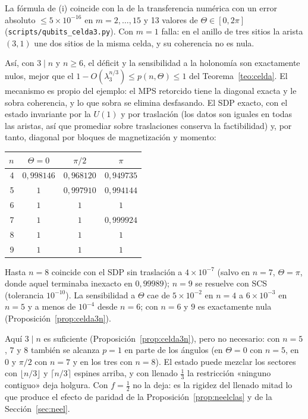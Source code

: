 \documentclass[11pt,a4paper]{article}
\theoremstyle{remark}
\begin{document}
La fórmula de (i) coincide con la de la transferencia numérica con un error absoluto
$\le5\times10^{-16}$ en $m=2,\dots,15$ y 13 valores de $\Theta\in[0,2\pi]$
(\texttt{scripts/qubits\_celda3.py}). Con $m=1$ falla: en el anillo de tres sitios la arista
$(3,1)$ une dos sitios de la misma celda, y su coherencia no es nula.

Así, con $3\mid n$ y $n\ge6$, el déficit y la sensibilidad a la holonomía son exactamente nulos,
mejor que el $1-O(\lambda_3^{n/3})\le p(n,\Theta)\le1$ del Teorema~\ref{teo:celda}. El mecanismo es
propio del ejemplo: el MPS retorcido tiene la diagonal exacta y le sobra coherencia, y lo que sobra
se elimina desfasando. El SDP
exacto, con el estado invariante por la $U(1)$ y por traslación (los datos son iguales en todas
las aristas, así que promediar sobre traslaciones conserva la factibilidad) y, por tanto,
diagonal por bloques de magnetización y momento:
\begin{center}\small
\begin{tabular}{rccc}
\toprule
$n$ & $\Theta=0$ & $\pi/2$ & $\pi$\\
\midrule
4 & $0{,}998146$ & $0{,}968120$ & $0{,}949735$\\
5 & $1$ & $0{,}997910$ & $0{,}994144$\\
6 & $1$ & $1$ & $1$\\
7 & $1$ & $1$ & $0{,}999924$\\
8 & $1$ & $1$ & $1$\\
9 & $1$ & $1$ & $1$\\
\bottomrule
\end{tabular}
\end{center}
Hasta $n=8$ coincide con el SDP sin traslación a $4\times10^{-7}$ (salvo en $n=7$, $\Theta=\pi$,
donde aquel terminaba inexacto en $0{,}99989$); $n=9$ se resuelve con SCS
(tolerancia $10^{-10}$). La sensibilidad a $\Theta$ cae de $5\times10^{-2}$ en
$n=4$ a $6\times10^{-3}$ en $n=5$ y a menos de $10^{-4}$ desde $n=6$; con $n=6$ y $9$ es exactamente
nula (Proposición~\ref{prop:celda3n}).

Aquí $3\mid n$ es suficiente (Proposición~\ref{prop:celda3n}), pero no necesario: con $n=5$, $7$
y $8$ también se alcanza $p=1$ en parte de los ángulos (en $\Theta=0$ con $n=5$, en $0$ y $\pi/2$
con $n=7$ y en los tres con $n=8$). El estado puede mezclar los sectores con $\lfloor n/3\rfloor$ y
$\lceil n/3\rceil$ espines arriba, y con llenado $\tfrac13$ la restricción «ninguno contiguo» deja
holgura. Con $f=\tfrac12$ no la deja: es la rigidez del llenado mitad lo que produce el efecto de
paridad de la Proposición~\ref{prop:neelclas} y de la Sección~\ref{sec:neel}.
\end{document}
